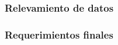 \documentclass[../../../main.tex]{subfiles}
\begin{document}
\subsubsection{Relevamiento de datos}\label{subsubsec:relevamiento}


\subsubsection{Requerimientos finales}\label{subsubsec:requerimientos_final}

\end{document}
